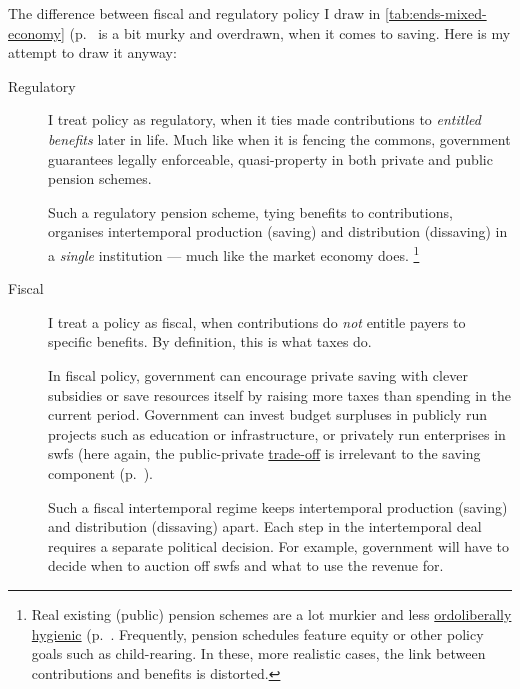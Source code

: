 The difference between fiscal and regulatory policy I draw in \autoref{tab:ends-mixed-economy} (p.~\pageref{tab:ends-mixed-economy} is a bit murky and overdrawn, when it comes to saving.
 Here is my attempt to draw it anyway:
\begin{description}
	\item[Regulatory] I treat policy as regulatory, when it ties made contributions to \emph{entitled benefits} later in life.
	Much like when it is fencing the commons, government guarantees legally enforceable, quasi-property in both private and public pension schemes.

	Such a regulatory pension scheme, tying benefits to contributions, organises intertemporal production (saving) and distribution (dissaving) in a \emph{single} institution --- much like the market economy does.
	\footnote{
		Real existing (public) pension schemes are a lot murkier and less \hyperref[sec:ordoliberal-hygiene]{ordoliberally hygienic} (p.~\pageref{sec:ordoliberal-hygiene}.
		Frequently, pension schedules feature equity or other policy goals such as child-rearing.
		In these, more realistic cases, the link between contributions and benefits is distorted.
	}

	\item[Fiscal] I treat a policy as fiscal, when contributions do \emph{not} entitle payers to specific benefits.
	By definition, this is what taxes do.

	In fiscal policy, government can encourage private saving with clever subsidies or save resources itself by raising more taxes than spending in the current period.
	Government can invest budget surpluses in publicly run projects such as education or infrastructure, or privately run enterprises in \glspl{swf} (here again, the public-private \hyperref[sec:trade-offs]{trade-off} is irrelevant to the saving component (p.~\pageref{sec:trade-offs}).

	Such a fiscal intertemporal regime keeps intertemporal production (saving) and distribution (dissaving) apart.
	Each step in the intertemporal deal requires a separate political decision.
	For example, government will have to decide when to auction off \glspl{swf} and what to use the revenue for.
\end{description}

